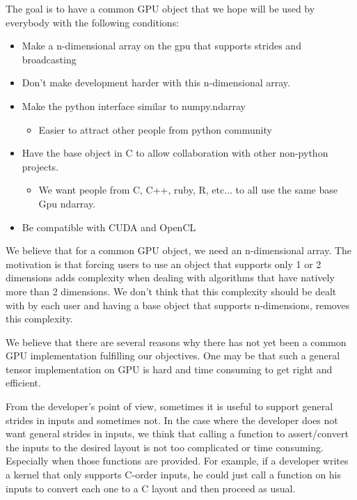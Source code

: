 \documentclass{article} %
\begin{document}
The goal is to have a common GPU object that we hope will be used by everybody with the following conditions:

\begin{itemize}
\item Make a n-dimensional array on the gpu that supports strides and broadcasting
\item Don't make development harder with this n-dimensional array. 
\item Make the python interface similar to numpy.ndarray
  \begin{itemize}
  \item Easier to attract other people from python community
  \end{itemize}
\item Have the base object in C to allow collaboration with other non-python projects.
  \begin{itemize}
  \item We want people from C, C++, ruby, R, etc... to all use the same base Gpu ndarray.
  \end{itemize}
\item Be compatible with CUDA and OpenCL
\end{itemize}

We believe that for a common GPU object, we need an n-dimensional
array. The motivation is that forcing users to use an object that
supports only 1 or 2 dimensions adds complexity when dealing with algorithms that have natively more than 2 dimensions.
We don't think that this complexity should be dealt with by each user and 
having a base object that supports n-dimensions, removes
this complexity.

We believe that there are several reasons why there has not yet been a common GPU implementation fulfilling our objectives.
One may be that such a general tensor implementation on GPU is hard and time consuming to get right and efficient.

From the developer's point of view, sometimes it is useful to support general strides in inputs and sometimes not.
In the case where the developer does not want general strides in inputs, we think
that calling a function to assert/convert the inputs to the desired layout is not too complicated or time consuming.
Especially when those functions are provided. For example, if a
developer writes a kernel that only supports C-order inputs, he could
just call a function on his inputs to convert each one to a C layout
and then proceed as usual.
\end{document}
